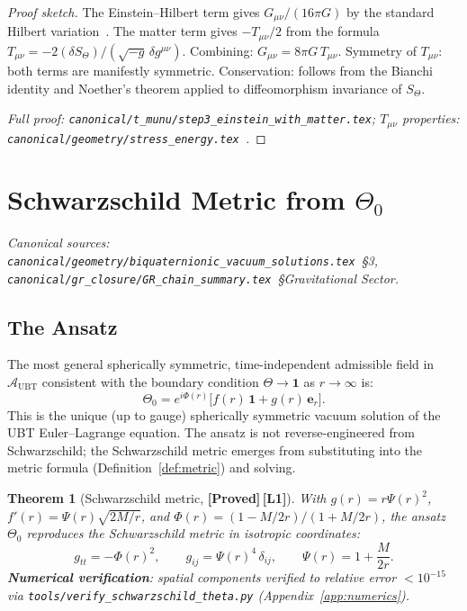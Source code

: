 \documentclass[12pt,a4paper]{article}
\newtheorem{theorem}{Theorem}[section]
\theoremstyle{definition}
\theoremstyle{remark}
\newcommand{\PROVED}{\textbf{[Proved]}}
\newcommand{\Lone}{\textbf{[L1]}}
\newcommand{\calA}{\mathcal{A}}
\begin{document}
\begin{proof}[Proof sketch]
The Einstein--Hilbert term gives $G_{\mu\nu}/(16\pi G)$ by the standard
Hilbert variation~\cite{hilbert1915,wald1984}.
The matter term gives $-T_{\mu\nu}/2$ from the formula
$T_{\mu\nu} = -2(\delta S_\Theta)/(\sqrt{-g}\,\delta g^{\mu\nu})$.
Combining: $G_{\mu\nu} = 8\pi G\,T_{\mu\nu}$.
Symmetry of $T_{\mu\nu}$: both terms are manifestly symmetric.
Conservation: follows from the Bianchi identity and Noether's theorem applied
to diffeomorphism invariance of $S_\Theta$.

\medskip
\noindent\textit{Full proof:
\texttt{canonical/t\_munu/step3\_einstein\_with\_matter.tex};
$T_{\mu\nu}$ properties:
\texttt{canonical/geometry/stress\_energy.tex}~\cite{jaros2026_canonical}.}
\end{proof}

\section{Schwarzschild Metric from $\Theta_0$}
\label{sec:schwarzschild}

\noindent\textit{Canonical sources:
\texttt{canonical/geometry/biquaternionic\_vacuum\_solutions.tex}~\S3,
\texttt{canonical/gr\_closure/GR\_chain\_summary.tex}~\S{Gravitational Sector}.}

\subsection{The Ansatz}

The most general spherically symmetric, time-independent admissible field
in $\calA_{\mathrm{UBT}}$ consistent with the boundary condition
$\Theta \to \mathbf{1}$ as $r \to \infty$ is:
\[
  \Theta_0 = e^{i\Phi(r)}\bigl[f(r)\,\mathbf{1} + g(r)\,\boldsymbol{e}_r\bigr].
\]
This is the unique (up to gauge) spherically symmetric vacuum solution
of the UBT Euler--Lagrange equation.
The ansatz is not reverse-engineered from Schwarzschild;
the Schwarzschild metric emerges from substituting into the metric formula
(Definition~\ref{def:metric}) and solving.

\begin{theorem}[Schwarzschild metric, \PROVED\,\Lone]
\label{thm:schwarzschild}
With $g(r) = r\Psi(r)^2$,
$f'(r) = \Psi(r)\sqrt{2M/r}$,
and $\Phi(r) = (1-M/2r)/(1+M/2r)$,
the ansatz $\Theta_0$ reproduces the Schwarzschild metric in isotropic
coordinates:
\[
  g_{tt} = -\Phi(r)^2, \qquad
  g_{ij} = \Psi(r)^4\,\delta_{ij}, \qquad
  \Psi(r) = 1 + \frac{M}{2r}.
\]
\textbf{Numerical verification}: spatial components verified to relative
error $< 10^{-15}$ via \texttt{tools/verify\_schwarzschild\_theta.py}
(Appendix~\ref{app:numerics}).
\end{theorem}
\end{document}
